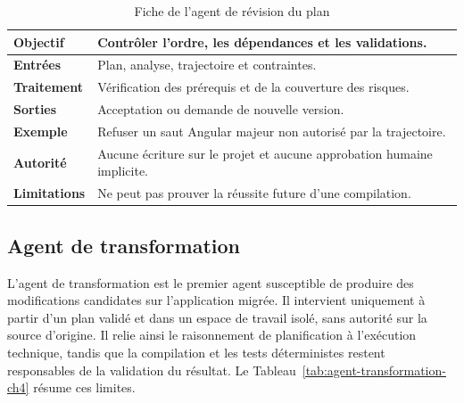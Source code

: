 \begin{table}[H]
    \centering
    \caption{Fiche de l'agent de révision du plan}
    \label{tab:agent-review-plan-ch4}
    \small
    \begin{tabularx}{\textwidth}{|>{\bfseries\RaggedRight\arraybackslash}p{3.1cm}|>{\RaggedRight\arraybackslash}X|}
        \hline
        Objectif & Contrôler l'ordre, les dépendances et les validations. \\
        \hline
        Entrées & Plan, analyse, trajectoire et contraintes. \\
        \hline
        Traitement & Vérification des prérequis et de la couverture des risques. \\
        \hline
        Sorties & Acceptation ou demande de nouvelle version. \\
        \hline
        Exemple & Refuser un saut Angular majeur non autorisé par la trajectoire. \\
        \hline
        Autorité & Aucune écriture sur le projet et aucune approbation humaine implicite. \\
        \hline
        Limitations & Ne peut pas prouver la réussite future d'une compilation. \\
        \hline
    \end{tabularx}
\end{table}

\subsection{Agent de transformation}

L'agent de transformation est le premier agent susceptible de produire des modifications candidates sur l'application migrée. Il intervient uniquement à partir d'un plan validé et dans un espace de travail isolé, sans autorité sur la source d'origine. Il relie ainsi le raisonnement de planification à l'exécution technique, tandis que la compilation et les tests déterministes restent responsables de la validation du résultat. Le Tableau~\ref{tab:agent-transformation-ch4} résume ces limites.

